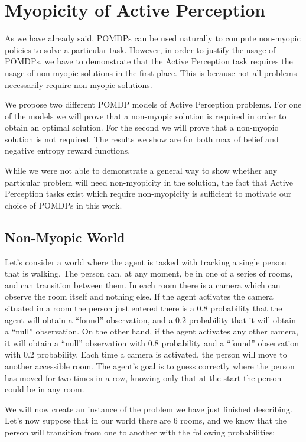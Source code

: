 \section{Myopicity of Active Perception}

As we have already said, POMDPs can be used naturally to compute non-myopic policies to solve a
particular task. However, in order to justify the usage of POMDPs, we have to demonstrate that the
Active Perception task requires the usage of non-myopic solutions in the first place.  This is
because not all problems necessarily require non-myopic solutions.

We propose two different POMDP models of Active Perception problems. For one of the models we will
prove that a non-myopic solution is required in order to obtain an optimal solution. For the second
we will prove that a non-myopic solution is not required. The results we show are for both max of
belief and negative entropy reward functions.

While we were not able to demonstrate a general way to show whether any particular problem will need
non-myopicity in the solution, the fact that Active Perception tasks exist which require
non-myopicity is sufficient to motivate our choice of POMDPs in this work.

\subsection{Non-Myopic World}

Let's consider a world where the agent is tasked with tracking a single person that is walking. The
person can, at any moment, be in one of a series of rooms, and can transition between them. In each
room there is a camera which can observe the room itself and nothing else. If the agent activates
the camera situated in a room the person just entered there is a $0.8$ probability that the agent will
obtain a ``found'' observation, and a $0.2$ probability that it will obtain a ``null'' observation.
On the other hand, if the agent activates any other camera, it will obtain a ``null'' observation
with $0.8$ probability and a ``found'' observation with $0.2$ probability. Each time a camera is
activated, the person will move to another accessible room. The agent's goal is to guess correctly
where the person has moved for two times in a row, knowing only that at the start the person could
be in any room.

We will now create an instance of the problem we have just finished describing. Let's now suppose
that in our world there are 6 rooms, and we know that the person will transition from one to another
with the following probabilities:

